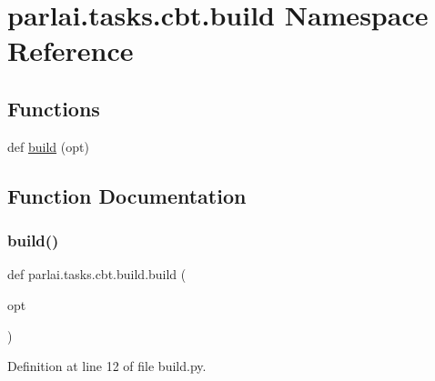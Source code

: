 \hypertarget{namespaceparlai_1_1tasks_1_1cbt_1_1build}{}\section{parlai.\+tasks.\+cbt.\+build Namespace Reference}
\label{namespaceparlai_1_1tasks_1_1cbt_1_1build}
\subsection*{Functions}
\begin{DoxyCompactItemize}
\item 
def \hyperlink{namespaceparlai_1_1tasks_1_1cbt_1_1build_a761a40fc1977992c31cb21a230ba12c5}{build} (opt)
\end{DoxyCompactItemize}


\subsection{Function Documentation}
\mbox{\label{namespaceparlai_1_1tasks_1_1cbt_1_1build_a761a40fc1977992c31cb21a230ba12c5}} 
\subsubsection{\texorpdfstring{build()}{build()}}
{\footnotesize\ttfamily def parlai.\+tasks.\+cbt.\+build.\+build (\begin{DoxyParamCaption}\item[{}]{opt }\end{DoxyParamCaption})}



Definition at line 12 of file build.\+py.

